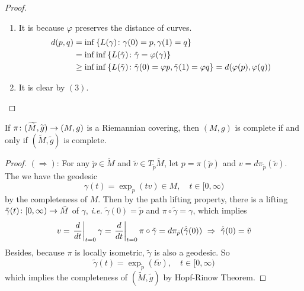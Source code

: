 \begin{enumerate}[label=\arabic{*}.]
\begin{proof}
\begin{enumerate}[label=(\arabic{*})]
			\item It is because $\varphi$ preserves the distance of curves.
			\begin{equation*}
				\begin{aligned}
					d(p,q) &= \inf\left\{L(\gamma) \colon \gamma(0) = p,\gamma(1)=q\right\} \\
					&= \inf\inf\left\{L(\tilde{\gamma}) \colon \tilde{\gamma}=\varphi(\gamma)\right\} \\
					&\geq \inf\inf\left\{L(\tilde{\gamma}) \colon \tilde{\gamma}(0) = \varphi{p},\tilde{\gamma}(1)=\varphi{q}\right\} = d(\varphi({p}),\varphi({q}))
				\end{aligned}
			\end{equation*}
			\item It is clear by $(3)$. \qedhere
		\end{enumerate}
	\end{proof}

	\begin{prop}
		If $\pi \colon (\widetilde{M},\widetilde{g}) \rightarrow (M,g)$ is a Riemannian covering, then $(M,g)$ is complete if and only if $(\widetilde{M},\widetilde{g})$ is complete.
	\end{prop}
	\begin{proof}
		$(\Rightarrow)$: For any $\tilde{p} \in \widetilde{M}$ and $\tilde{v} \in T_{\tilde{p}}\widetilde{M}$, let $p = \pi(\tilde{p})$ and $v = d\pi_{\tilde{p}}(\tilde{v})$. The we have the geodesic
		\begin{equation*}
			\gamma(t) = \exp_p(tv) \in M,\quad t\in[0,\infty)
		\end{equation*}
		by the completeness of $M$. Then by the path lifting property, there is a lifting $\tilde{\gamma}(t) \colon [0,\infty) \rightarrow \tilde{M}$ of $\gamma$, \emph{i.e.} $\tilde{\gamma}(0) = \tilde{p}$ and $\pi \circ \tilde{\gamma} = \gamma$, which implies
		\begin{equation*}
			v = \left.\frac{d}{dt}\right\lvert_{t = 0}\gamma = \left.\frac{d}{dt}\right\lvert_{t = 0} \pi \circ \tilde{\gamma} = d\pi_{\tilde{p}}(\dot{\tilde{\gamma}}(0))~\Rightarrow~\dot{\tilde{\gamma}}(0) = \tilde{v}
		\end{equation*}
		Besides, because $\pi$ is locally isometric, $\tilde{\gamma}$ is also a geodesic. So
		\begin{equation*}
			\tilde{\gamma}(t) = \exp_{\tilde{p}}(t\tilde{v}),\quad t \in [0,\infty)
		\end{equation*}
		which implies the completeness of $(\widetilde{M},\widetilde{g})$ by Hopf-Rinow Theorem.


\end{proof}
\end{enumerate}
